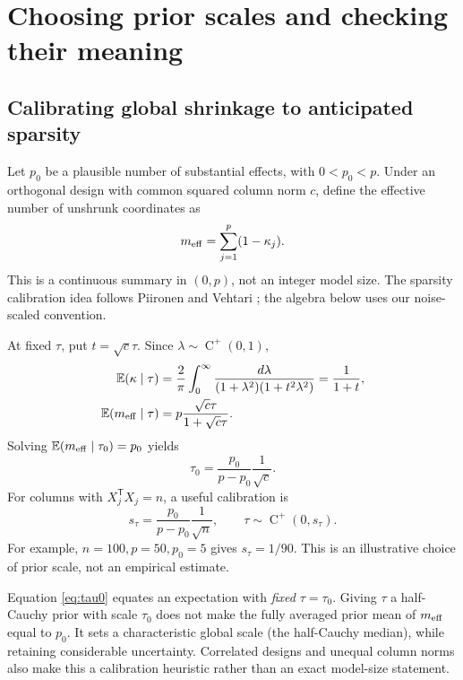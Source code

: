 \documentclass[11pt,letterpaper]{article}
\numberwithin{equation}{section}
\newcommand{\E}{\mathbb{E}}
\newcommand{\HC}{\operatorname{C}^{+}}
\newcommand{\given}{\mid}
\newcommand{\trans}{^{\mathsf T}}
\begin{document}
\section{Choosing prior scales and checking their meaning}\label{sec:hyperparameters}

\subsection{Calibrating global shrinkage to anticipated sparsity}

Let \(p_0\) be a plausible number of substantial effects, with \(0<p_0<p\).
Under an orthogonal design with common squared column norm \(c\), define
the effective number of unshrunk coordinates as
\begin{equation}\label{eq:meff}
 m_{\rm eff}=\sum_{j=1}^p(1-\kappa_j).
\end{equation}
This is a continuous summary in \((0,p)\), not an integer model size. The
sparsity calibration idea follows Piironen and Vehtari \cite{piironen2017};
the algebra below uses our noise-scaled convention.

At fixed \(\tau\), put \(t=\sqrt c\tau\). Since
\(\lambda\sim\HC(0,1)\),
\begin{align}
 \E(\kappa\given\tau)
 &=\frac2\pi\int_0^\infty
       \frac{d\lambda}{(1+\lambda^2)(1+t^2\lambda^2)}
   =\frac{1}{1+t},\\
 \E(m_{\rm eff}\given\tau)&=p\frac{\sqrt c\tau}{1+\sqrt c\tau}.
\end{align}
Solving \(\E(m_{\rm eff}\given\tau_0)=p_0\) yields
\begin{equation}\label{eq:tau0}
 \tau_0=\frac{p_0}{p-p_0}\frac1{\sqrt c}.
\end{equation}
For columns with \(X_j\trans X_j=n\), a useful calibration is
\begin{equation}\label{eq:stau}
 s_\tau=\frac{p_0}{p-p_0}\frac1{\sqrt n},
 \qquad \tau\sim\HC(0,s_\tau).
\end{equation}
For example, \(n=100,p=50,p_0=5\) gives \(s_\tau=1/90\).
This is an illustrative choice of prior scale, not an empirical estimate.

Equation \eqref{eq:tau0} equates an expectation with \emph{fixed}
\(\tau=\tau_0\). Giving \(\tau\) a half-Cauchy prior with scale
\(\tau_0\) does not make the fully averaged prior mean of \(m_{\rm eff}\)
equal to \(p_0\). It sets a characteristic global scale (the half-Cauchy
median), while retaining considerable uncertainty. Correlated designs and
unequal column norms also make this a calibration heuristic rather than an
exact model-size statement.
\end{document}
